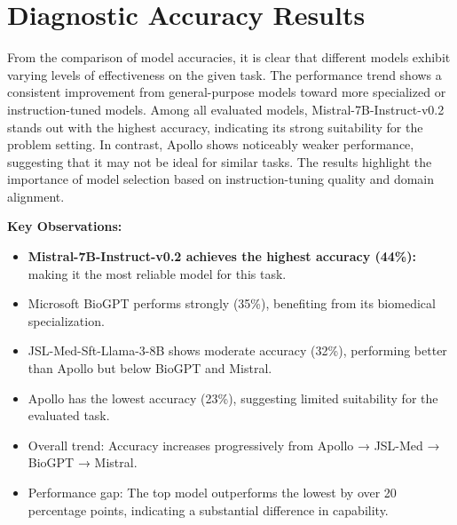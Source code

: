 \section{Diagnostic Accuracy Results}


From the comparison of model accuracies, it is clear that different models exhibit varying levels of effectiveness on the given task. The performance trend shows a consistent improvement from general-purpose models toward more specialized or instruction-tuned models. Among all evaluated models, Mistral-7B-Instruct-v0.2 stands out with the highest accuracy, indicating its strong suitability for the problem setting. In contrast, Apollo shows noticeably weaker performance, suggesting that it may not be ideal for similar tasks. The results highlight the importance of model selection based on instruction-tuning quality and domain alignment.

\textbf{Key Observations:}
\begin{itemize}
    \item \textbf{Mistral-7B-Instruct-v0.2 achieves the highest accuracy (44\%):} making it the most reliable model for this task.

    \item Microsoft BioGPT performs strongly (35\%), benefiting from its biomedical specialization.

    \item JSL-Med-Sft-Llama-3-8B shows moderate accuracy (32\%), performing better than Apollo but below BioGPT and Mistral.

    \item Apollo has the lowest accuracy (23\%), suggesting limited suitability for the evaluated task.

    \item Overall trend: Accuracy increases progressively from Apollo → JSL-Med → BioGPT → Mistral.

    \item Performance gap: The top model outperforms the lowest by over 20 percentage points, indicating a substantial difference in capability.
\end{itemize}

